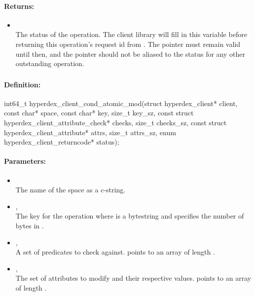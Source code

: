 \paragraph{Returns:}
\begin{itemize}[noitemsep]
\item {}\\
The status of the operation.  The client library will fill in this variable before returning this operation's request id from .  The pointer must remain valid until then, and the pointer should not be aliased to the status for any other outstanding operation.
\end{itemize}

\pagebreak
\subsubsection{}
\label{api:c:cond_atomic_mod}


\paragraph{Definition:}
\begin{ccode}
int64_t hyperdex_client_cond_atomic_mod(struct hyperdex_client* client,
        const char* space,
        const char* key, size_t key_sz,
        const struct hyperdex_client_attribute_check* checks, size_t checks_sz,
        const struct hyperdex_client_attribute* attrs, size_t attrs_sz,
        enum hyperdex_client_returncode* status);
\end{ccode}

\paragraph{Parameters:}
\begin{itemize}[noitemsep]
\item {}\\
The name of the space as a c-string.
\item {}, \\
The key for the operation where  is a bytestring and  specifies the number of bytes in .
\item {}, \\
A set of predicates to check against.   points to an array of length .
\item {}, \\
The set of attributes to modify and their respective values.   points to an array of length .
\end{itemize}

